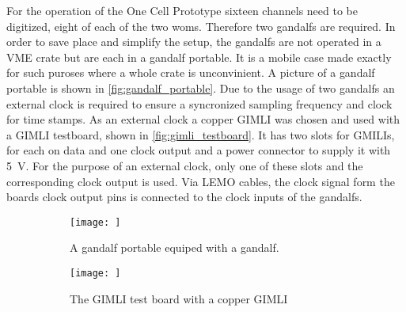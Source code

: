 For the operation of the One Cell Prototype sixteen channels need to be digitized, eight of each of the two \acp{wom}.
Therefore two \acp{gandalf} are required.
In order to save place and simplify the setup, the \acp{gandalf} are not operated in a VME crate but are each in a \ac{gandalf} portable.
It is a mobile case made exactly for such puroses where a whole crate is unconvinient.
A picture of a \ac{gandalf} portable is shown in \autoref{fig:gandalf_portable}.
Due to the usage of two \acp{gandalf} an external clock is required to ensure a syncronized sampling frequency and clock for time stamps.
As an external clock a copper GIMLI was chosen and used with a GIMLI testboard, shown in \autoref{fig:gimli_testboard}.
It has two slots for GMILIs, for each on data and one clock output and a power connector to supply it with \SI{5}{\volt}.
For the purpose of an external clock, only one of these slots and the corresponding clock output is used.
Via LEMO cables, the clock signal form the boards clock output pins is connected to the clock inputs of the \acp{gandalf}.
\begin{figure}
	\centering
	\begin{figure}
		\centering
		\texttt{[image: ]}
		\caption[A \ac{gandalf} portable equiped with a \ac{gandalf}.]{A \ac{gandalf} portable equiped with a \ac{gandalf}.}
		\label{}
	\end{figure}
	\begin{figure}
		\centering
		\texttt{[image: ]}
		\caption[]{The GIMLI test board with a copper GIMLI}
		\label{}
	\end{figure}
	\caption[]{}
	\label{}
\end{figure}
